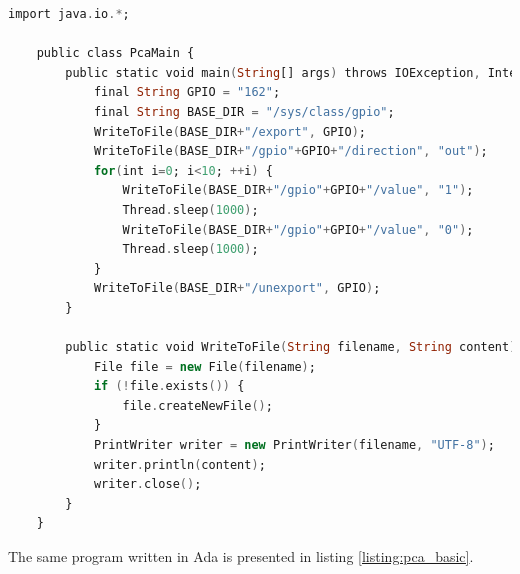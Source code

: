 \begin{lstlisting}[language=ada, frame=single, gobble=0, caption={Turning pin on and off}]
	import java.io.*;

	public class PcaMain {
		public static void main(String[] args) throws IOException, InterruptedException {
			final String GPIO = "162";
			final String BASE_DIR = "/sys/class/gpio";			
			WriteToFile(BASE_DIR+"/export", GPIO);
			WriteToFile(BASE_DIR+"/gpio"+GPIO+"/direction", "out");			
			for(int i=0; i<10; ++i) {
	            WriteToFile(BASE_DIR+"/gpio"+GPIO+"/value", "1");
	            Thread.sleep(1000);
				WriteToFile(BASE_DIR+"/gpio"+GPIO+"/value", "0");
	            Thread.sleep(1000);
			}			
			WriteToFile(BASE_DIR+"/unexport", GPIO);
		}
		
		public static void WriteToFile(String filename, String content) throws IOException {
			File file = new File(filename);			 
			if (!file.exists()) {
				file.createNewFile();
			}
			PrintWriter writer = new PrintWriter(filename, "UTF-8");
			writer.println(content);
			writer.close();
		}
	}
\end{lstlisting} 
\label{listing:pca_java}

The same program written in Ada is presented in listing \ref{listing:pca_basic}.

